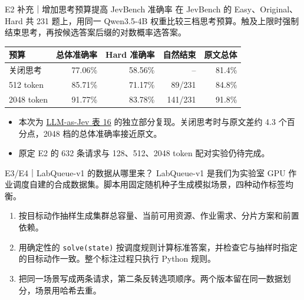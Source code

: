\documentclass{beamer}
\begin{document}
\begin{frame}{E2 补充｜增加思考预算提高 JevBench 准确率}
  \small
  在 JevBench 的 Easy、Original、Hard 共 231 题上，用同一 Qwen3.5-4B 权重比较三档思考预算。触及上限时强制结束思考，再按候选答案后缀的对数概率选答案。

  \medskip
  {\centering
  \setlength{\tabcolsep}{5pt}
  \begin{tabular}{@{}lrrrr@{}}
    \toprule
    \textbf{预算} & \textbf{总体准确率} & \textbf{Hard 准确率} & \textbf{自然结束} & \textbf{原文总体}\\
    \midrule
    关闭思考 & 77.06\% & 58.56\% & --      & 81.4\%\\
    512 token  & 85.71\% & 71.17\% & 89/231  & 84.8\%\\
    2048 token & 91.77\% & 83.78\% & 141/231 & 91.8\%\\
    \bottomrule
  \end{tabular}\par}

  \medskip
  \begin{itemize}
    \item 本次为 \href{https://arxiv.org/abs/2610.02076v3}{LLM-as-Jev 表 16} 的独立部分复现。关闭思考时与原文差约 4.3 个百分点，2048 档的总体准确率接近原文。
    \item 原定 E2 的 632 条请求与 128、512、2048 token 配对实验仍待完成。
  \end{itemize}
\end{frame}

\begin{frame}{E3/E4｜LabQueue-v1 的数据从哪里来？}
  \small
  LabQueue-v1 是我们为实验室 GPU 作业调度自建的合成数据集。脚本用固定随机种子生成模拟场景，四种动作标签均衡。

  \medskip
  \begin{enumerate}
    \item 按目标动作抽样生成集群总容量、当前可用资源、作业需求、分片方案和前置依赖。
    \item 用确定性的 \texttt{solve(state)} 按调度规则计算标准答案，并检查它与抽样时指定的目标动作一致。整个标注过程只执行 Python 规则。
    \item 把同一场景写成两条请求，第二条反转选项顺序。两个版本留在同一数据划分，场景用哈希去重。
  \end{enumerate}
\end{frame}
\end{document}
